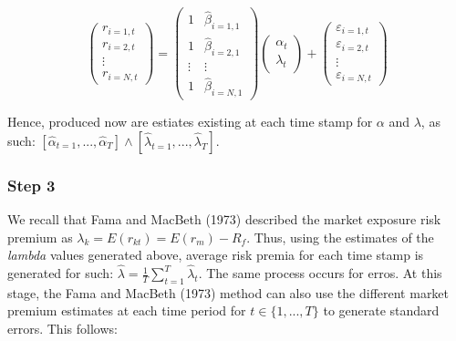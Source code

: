 \documentclass[11pt, english]{article}
\begin{document}
		$$        
                \begin{pmatrix}
                        r_{i=1,t}\\
                        r_{i=2,t}\\
                        \vdots\\
                        r_{i=N,t}
                \end{pmatrix}=
                \begin{pmatrix}
                        1 & \hat{\beta}_{i=1,1}\\
                        1 & \hat{\beta}_{i=2,1}\\ 
                        \vdots & \vdots \\
                        1 & \hat{\beta}_{i=N,1}
                \end{pmatrix}
                \begin{pmatrix}
                        \alpha_t\\
                        \lambda_t
                \end{pmatrix}+
                \begin{pmatrix}
                        \varepsilon_{i=1,t}\\
                        \varepsilon_{i=2,t}\\
                        \vdots\\
                        \varepsilon_{i=N,t}
                \end{pmatrix}
                $$ 
	
	Hence, produced now are estiates existing at each time stamp for $\alpha$ and $\lambda$, as such: $[\hat{\alpha}_{t=1},...,\hat{\alpha}_T]\land[\hat{\lambda}_{t=1},...,\hat{\lambda}_T]$.

		\subsubsection*{Step 3}

	We recall that Fama and MacBeth (1973) described the market exposure risk premium as $\lambda_k=E(r_{kt})=E(r_m)-R_f$. Thus, using the estimates of the \textit{lambda} values generated above, average risk premia for each time stamp is generated for such: $\hat{\lambda}=\frac{1}{T}\sum_{t=1}^T\hat{\lambda}_t$. The same process occurs for erros. At this stage, the Fama and MacBeth (1973) method can also use the different market premium estimates at each time period for $t\in\{1,...,T\}$ to generate standard errors. This follows:
\end{document}
